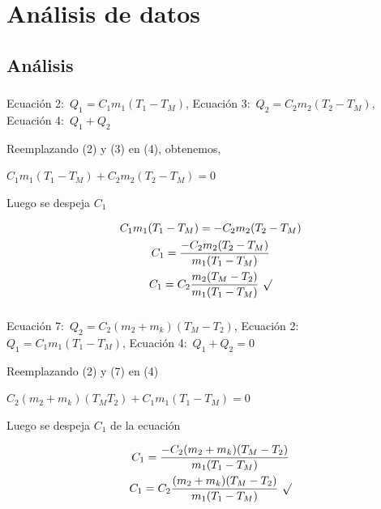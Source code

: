 \documentclass[letterpaper, 12pt]{article}
\begin{document}
\section{Análisis de datos}

\subsection{Análisis}

\subsubsection{}

Ecuación 2:~$Q_1 = C_1 m_1 (T_1 - T_M)$, Ecuación 3:~$Q_2 =
      C_2 m_2 (T_2 - T_M)$, Ecuación 4:~$Q_1 + Q_2$

Reemplazando (2) y (3) en (4), obtenemos,

$C_1 m_1 (T_1 - T_M) + C_2 m_2 (T_2 - T_M) = 0$

Luego se despeja $C_1$

\begin{equation*}
      \begin{gathered}
            C_1 m_1 (T_1 - T_M) = -C_2 m_2 (T_2 - T_M) \\
            C_1 = \frac{- C_2 m_2 (T_2 - T_M)}{m_1 (T_1 - T_M)} \\
            C_1 = C_2 \frac{m_2 (T_M - T_2)}{m_1 (T_1 - T_M)}~\surd
      \end{gathered}
\end{equation*}

\subsubsection{}

Ecuación 7:~$Q_2 = C_2 (m_2 + m_k)(T_M - T_2)$, Ecuación
2:~$Q_1 = C_1 m_1 (T_1 - T_M)$, Ecuación 4:~$Q_1 + Q_2 = 0$

Reemplazando (2) y (7) en (4)

$C_2 (m_2 + m_k)(T_M T_2) + C_1 m_1 (T_1 - T_M) = 0$

Luego se despeja $C_1$ de la ecuación

\begin{equation*}
      \begin{gathered}
            C_1 = \frac{- C_2(m_2 + m_k)(T_M - T_2)}{m_1 (T_1 - T_M)} \\
            C_1 = C_2 \frac{(m_2 + m_k)(T_M - T_2)}{m_1 (T_1 - T_M)}~\surd
      \end{gathered}
\end{equation*}
\end{document}
